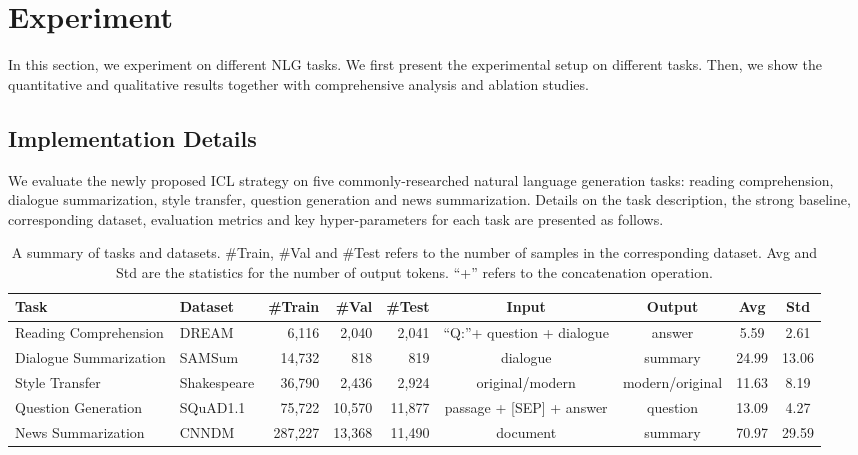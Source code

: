 \section{Experiment}
In this section, we experiment on different NLG tasks. We first present the experimental setup on different tasks. Then, we show the quantitative and qualitative results together with comprehensive analysis and ablation studies.

\subsection{Implementation Details}
We evaluate the newly proposed ICL strategy on five commonly-researched natural language generation tasks: reading comprehension, dialogue summarization, style transfer, question generation and news summarization. Details on the task description, the strong baseline, corresponding  dataset, evaluation metrics and key hyper-parameters for each task are presented as follows.

\begin{table*}[th]
	\scriptsize
	\centering
	\begin{tabular}{lp{1.1cm}rrrcccc}
		\hline
		Task & Dataset & \#Train & \#Val & \#Test & Input & Output & Avg & Std\\
		\hline
		Reading Comprehension & DREAM & 6,116 & 2,040 & 2,041 & ``Q:''+ question + dialogue & answer & 5.59 & 2.61\\
		Dialogue Summarization & SAMSum & 14,732 & 818 & 819 & dialogue & summary  & 24.99 & 13.06\\
		Style Transfer & Shakespeare & 36,790 & 2,436 & 2,924 & original/modern  & modern/original  & 11.63 & 8.19 \\
		Question Generation & SQuAD1.1 & 75,722 & 10,570 & 11,877 & passage + [SEP] + answer & question & 13.09 & 4.27 \\
		News Summarization & CNNDM & 287,227& 13,368& 11,490 & document & summary & 70.97 & 29.59\\ 
		\hline
	\end{tabular}
	\caption{A summary of tasks and datasets. \#Train, \#Val and \#Test refers to the number of samples in the corresponding dataset. Avg and Std are the statistics for the number of output tokens. ``+'' refers to the concatenation operation.}
	\label{tab:taskdata}
\end{table*}

